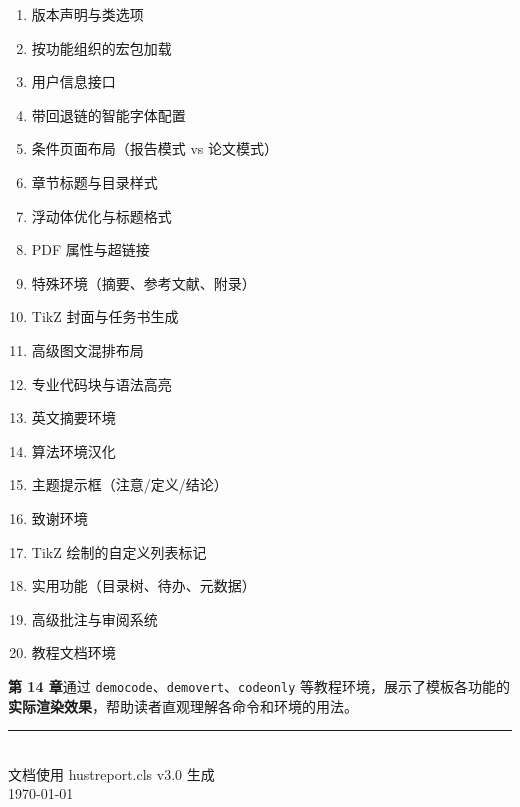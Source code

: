 \documentclass[linux]{hustreport}
\begin{document}
\begin{enumerate}
    \item 版本声明与类选项
    \item 按功能组织的宏包加载
    \item 用户信息接口
    \item 带回退链的智能字体配置
    \item 条件页面布局（报告模式 vs 论文模式）
    \item 章节标题与目录样式
    \item 浮动体优化与标题格式
    \item PDF 属性与超链接
    \item 特殊环境（摘要、参考文献、附录）
    \item TikZ 封面与任务书生成
    \item 高级图文混排布局
    \item 专业代码块与语法高亮
    \item 英文摘要环境
    \item 算法环境汉化
    \item 主题提示框（注意/定义/结论）
    \item 致谢环境
    \item TikZ 绘制的自定义列表标记
    \item 实用功能（目录树、待办、元数据）
    \item 高级批注与审阅系统
    \item 教程文档环境
\end{enumerate}

\textbf{第 14 章}通过 \texttt{democode}、\texttt{demovert}、\texttt{codeonly} 等教程环境，展示了模板各功能的\textbf{实际渲染效果}，帮助读者直观理解各命令和环境的用法。

\vspace{2cm}
\begin{center}
    \rule{0.4\textwidth}{0.5pt}\\[5pt]
    {\small 文档使用 hustreport.cls v3.0 生成}\\
    {\small \today}
\end{center}
\end{document}
